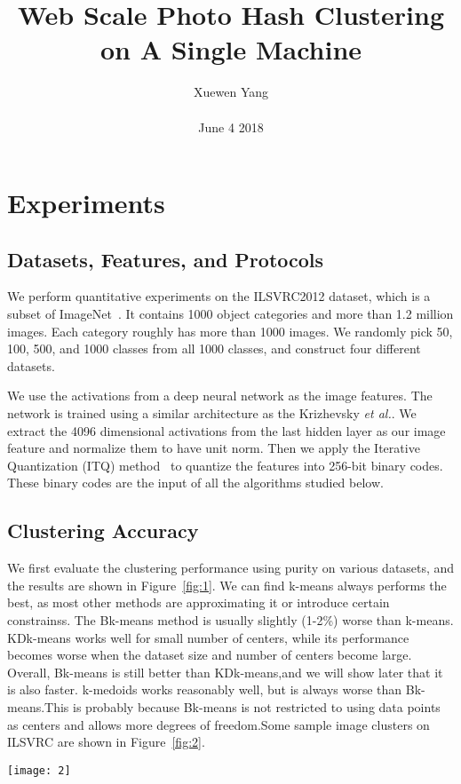 \documentclass[10pt,twocolumn,letterpaper]{article}
\author{Xuewen Yang\\\\
June 4 2018}
\title{Web Scale Photo Hash Clustering on A Single Machine}
\begin{document}
\maketitle
\section{Experiments}

\subsection{Datasets, Features, and Protocols}
We perform quantitative experiments on the
ILSVRC2012 dataset, which is a subset of ImageNet~\cite{Deng2009ImageNet}. It contains 1000 object categories and more than 1.2
million images. Each category roughly has more than 1000
images. We randomly pick 50, 100, 500, and 1000 classes
from all 1000 classes, and construct four different datasets.

We use the activations from a deep neural network as the image features. The network is trained using a similar architecture as the Krizhevsky \emph{et al.}\cite{Krizhevsky2012ImageNet}. We extract the 4096 dimensional activations from the last hidden layer as our image feature and normalize them to have unit norm. Then we apply the Iterative Quantization (ITQ) method~\cite{Gong2013Iterative} to quantize the features into 256-bit binary codes. These binary codes are the input of all the algorithms studied below.
\subsection{Clustering Accuracy}
We first evaluate the clustering performance using purity on various datasets, and the results are shown in Figure~\ref{fig:1}. We can find k-means always performs the best, as most other methods are approximating it or introduce certain constrainss. The Bk-means method is usually slightly (1-2\%) worse than k-means. KDk-means works well for small number of centers, while its performance becomes worse when the dataset size and number of centers become large. Overall, Bk-means is still better than KDk-means,and we will show later that it is also faster. k-medoids works reasonably well, but is always worse than Bk-means.This is probably because Bk-means is not restricted to using data points as centers and allows more degrees of freedom.Some sample image clusters on ILSVRC are shown in Figure~\ref{fig:2}.
\begin{figure*}
\centering
\texttt{[image: 2]}
\caption{Comparison of clustering purity on subsets of ILSVRC2012 dataset. Each subset contains different number of classes.}
\label{fig:1}
\end{figure*}
\end{document}
